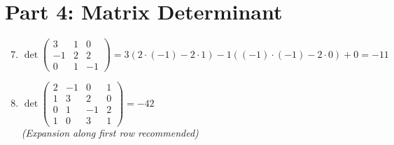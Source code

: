 \documentclass{article}
\begin{document}
\section*{Part 4: Matrix Determinant}
\begin{enumerate}
\setcounter{enumi}{6}
\item $\det\begin{pmatrix} 3 & 1 & 0 \\ -1 & 2 & 2 \\ 0 & 1 & -1 \end{pmatrix} = 3(2\cdot(-1)-2\cdot1) - 1((-1)\cdot(-1)-2\cdot0) + 0 = \boxed{-11}$

\item $\det\begin{pmatrix} 2 & -1 & 0 & 1 \\ 1 & 3 & 2 & 0 \\ 0 & 1 & -1 & 2 \\ 1 & 0 & 3 & 1 \end{pmatrix} = \boxed{-42}$ \\
\textit{(Expansion along first row recommended)}
\end{enumerate}

\newpage
\end{document}
